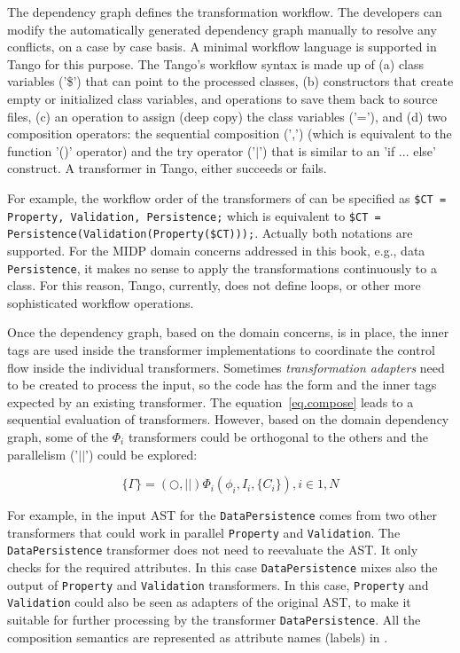 The dependency graph defines the transformation workflow. The developers can modify the automatically generated dependency graph manually to resolve any conflicts, on a case by case basis. A minimal workflow language is supported in Tango for this purpose. The Tango's workflow syntax is made up of (a) class variables ('\$') that can point to the processed classes, (b) constructors that create empty or initialized class variables, and operations to save them back to source files, (c) an operation to assign (deep copy) the class variables ('='), and (d) two composition operators:  the sequential composition (',') (which is equivalent to the function '()' operator) and the try operator ('$|$') that is similar to an 'if ... else' construct. A transformer in Tango, either succeeds or fails.

For example, the workflow order of the transformers of  can be specified as \texttt{\$CT = Property, Validation, Persistence;} which is equivalent to \texttt{\$CT = Per\-si\-ste\-nce(Va\-li\-da\-tion(Pro\-pe\-rty(\$CT)));}. Actually both notations are supported. For the MIDP domain concerns addressed in this book, e.g., data \texttt{Per\-si\-sten\-ce}, it makes no sense to apply the transformations continuously to a class. For this reason, Tango, currently, does not define loops, or other more sophisticated workflow operations.

Once the dependency graph, based on the domain concerns, is in place, the inner tags are used inside the transformer implementations to coordinate the control flow inside the individual transformers. Sometimes \textit{transformation adapters} need to be created to process the input, so the code has the form and the inner tags expected by an existing transformer. The equation~\ref{eq.compose} leads to a sequential evaluation of transformers. However, based on the domain dependency graph, some of the $\Phi_i$ transformers could be orthogonal to the others and the parallelism ('$||$') could be explored: 

\begin{equation}
\{\Gamma\} = (\bigcirc, | |) \Phi_i(\phi_i, I_i, \{C_i\}), i \in {1,N}
\label{eq.par}
\end{equation}

For example, in  the input AST for the \texttt{Da\-ta\-Per\-si\-ste\-nce} comes from two other transformers that could work in parallel \texttt{Pro\-per\-ty} and \texttt{Va\-li\-da\-tion}. The \texttt{Da\-ta\-Per\-si\-ste\-nce} transformer does not need to reevaluate the AST. It only checks for the required attributes. In this case \texttt{Da\-ta\-Per\-si\-ste\-nce} mixes also the output of \texttt{Pro\-per\-ty} and \texttt{Va\-li\-da\-tion} transformers. In this case, \texttt{Pro\-per\-ty} and \texttt{Va\-li\-da\-tion} could also be seen as adapters of the original AST, to make it suitable for further processing by the transformer \texttt{Da\-ta\-Per\-si\-ste\-nce}. All the composition semantics are represented as attribute names (labels) in .

